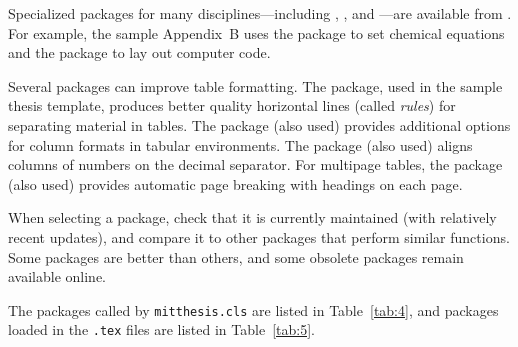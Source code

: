 \documentclass[11pt]{article}
\begin{document}
Specialized packages for many disciplines---including , , and ---are available from . For example, the sample Appendix~B uses the  package to set chemical equations and the  package to lay out computer code.

Several packages can improve table formatting.  The  package, used in the sample thesis template, produces better quality horizontal lines (called \emph{rules}) for separating material in tables.  The  package (also used) provides additional options for column formats in tabular environments. The  package (also used) aligns columns of numbers on the decimal separator. For multipage tables, the  package (also used) provides automatic page breaking with headings on each page.

When selecting a package, check that it is currently maintained (with relatively recent updates), and compare it to other packages that perform similar functions.  Some packages are better than others, and some obsolete packages remain available online.

The packages called by \texttt{mitthesis.cls} are listed in Table~\ref{tab:4}, and packages loaded in the \texttt{.tex} files are listed in Table~\ref{tab:5}.
\end{document}
